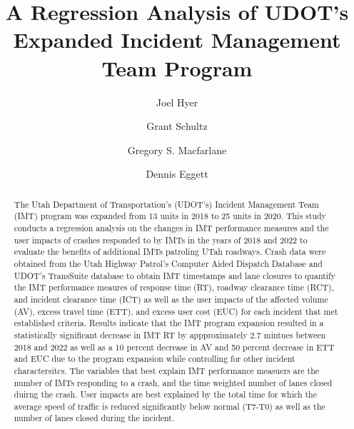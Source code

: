 \documentclass[
  letterpaper,
  authoryear]{elsarticle}
\begin{document}
\begin{frontmatter}
\title{A Regression Analysis of UDOT's Expanded Incident Management Team
Program}
\author[1]{Joel Hyer%
%
}

\author[1]{Grant Schultz%
%
}

\author[1]{Gregory S. Macfarlane%
%
}
\author[2]{Dennis Eggett%
%
}







        
\begin{abstract}
The Utah Department of Transportation's (UDOT's) Incident Management
Team (IMT) program was expanded from 13 units in 2018 to 25 units in
2020. This study conducts a regression analysis on the changes in IMT
performance measures and the user impacts of crashes responded to by
IMTs in the years of 2018 and 2022 to evaluate the benefits of
additional IMTs patroling UTah roadways. Crash data were obtained from
the Utah Highway Patrol's Computer Aided Dispatch Database and UDOT's
TransSuite database to obtain IMT timestamps and lane closures to
quantify the IMT performance meaures of response time (RT), roadway
clearance time (RCT), and incident clearance time (ICT) as well as the
user impacts of the affected volume (AV), excess travel time (ETT), and
excess user cost (EUC) for each incident that met established criteria.
Results indicate that the IMT program expansion resulted in a
statistically significant decrease in IMT RT by appproximately 2.7
mintues between 2018 and 2022 as well as a 10 percent decrease in AV and
50 percent decrease in ETT and EUC due to the program expansion while
controlling for other incident charactersitcs. The variables that best
explain IMT performance measuers are the number of IMTs responding to a
crash, and the time weighted number of lanes closed duirng the crash.
User impacts are best explained by the total time for which the average
speed of traffic is reduced significantly below normal (T7-T0) as well
as the number of lanes closed during the incident.
\end{abstract}





\end{frontmatter}
    
\end{document}
